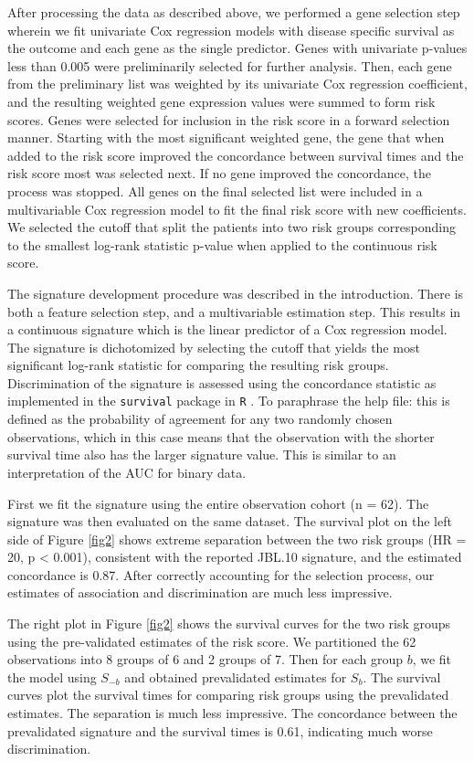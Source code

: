 \documentclass[11pt,]{article}
\begin{document}
After processing the data as described above, we performed a gene
selection step wherein we fit univariate Cox regression models with
disease specific survival as the outcome and each gene as the single
predictor. Genes with univariate p-values less than 0.005 were
preliminarily selected for further analysis. Then, each gene from the
preliminary list was weighted by its univariate Cox regression
coefficient, and the resulting weighted gene expression values were
summed to form risk scores. Genes were selected for inclusion in the
risk score in a forward selection manner. Starting with the most
significant weighted gene, the gene that when added to the risk score
improved the concordance between survival times and the risk score most
was selected next. If no gene improved the concordance, the process was
stopped. All genes on the final selected list were included in a
multivariable Cox regression model to fit the final risk score with new
coefficients. We selected the cutoff that split the patients into two
risk groups corresponding to the smallest log-rank statistic p-value
when applied to the continuous risk score.

The signature development procedure was described in the introduction.
There is both a feature selection step, and a multivariable estimation
step. This results in a continuous signature which is the linear
predictor of a Cox regression model. The signature is dichotomized by
selecting the cutoff that yields the most significant log-rank statistic
for comparing the resulting risk groups. Discrimination of the signature
is assessed using the concordance statistic as implemented in the
\texttt{survival} package in \texttt{R} \citep{survival}. To paraphrase
the help file: this is defined as the probability of agreement for any
two randomly chosen observations, which in this case means that the
observation with the shorter survival time also has the larger signature
value. This is similar to an interpretation of the AUC for binary data.

First we fit the signature using the entire observation cohort (n = 62).
The signature was then evaluated on the same dataset. The survival plot
on the left side of Figure \ref{fig2} shows extreme separation between
the two risk groups (HR = 20, p \textless{} 0.001), consistent with the
reported JBL.10 signature, and the estimated concordance is 0.87. After
correctly accounting for the selection process, our estimates of
association and discrimination are much less impressive.

The right plot in Figure \ref{fig2} shows the survival curves for the
two risk groups using the pre-validated estimates of the risk score. We
partitioned the 62 observations into 8 groups of 6 and 2 groups of 7.
Then for each group \(b\), we fit the model using \(S_{-b}\) and
obtained prevalidated estimates for \(S_{b}\). The survival curves plot
the survival times for comparing risk groups using the prevalidated
estimates. The separation is much less impressive. The concordance
between the prevalidated signature and the survival times is 0.61,
indicating much worse discrimination.
\end{document}
